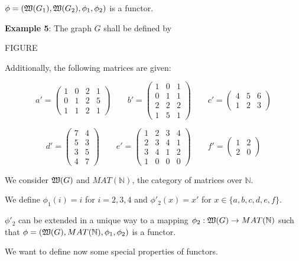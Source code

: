 $\phi = (\mbox{$\mathfrak{W}(G_1)$}, \mbox{$\mathfrak{W}(G_2)$}, \phi_1, \phi_2)$ is a functor.

\bigskip
{\bf Example 5}: The graph $G$ shall be defined by

FIGURE

Additionally, the following matrices are given:

\[
a' = \left( \begin{array}{cccc}
1 & 0 & 2 & 1 \\ 0 & 1 & 2 & 5 \\ 1 & 1 & 2 & 1
\end{array} \right)
\qquad 
b' = \left( \begin{array}{ccc}
1 & 0 & 1 \\ 0 & 1 & 1 \\ 2 & 2 & 2 \\ 1 & 5 & 1
\end{array} \right)
\qquad 
c' = \left( \begin{array}{ccc}
4 & 5 & 6 \\ 1 & 2 & 3
\end{array} \right)
\]

\[
d' = \left( \begin{array}{cc}
7 & 4 \\ 5 & 3 \\ 3 & 5 \\ 4 & 7
\end{array} \right)
\qquad
e' = \left( \begin{array}{cccc}
1&2&3&4 \\ 2&3&4&1 \\ 3&4&1&2 \\ 1&0&0&0
\end{array} \right)
\qquad
f' = \left( \begin{array}{cc}
1&2 \\ 2&0
\end{array} \right)
\]

We consider $\mbox{$\mathfrak{W}(G)$}$ and $MAT(\mathbb{N})$, the category of matrices
over $\mathbb{N}$.

We define $\phi_1(i) = i$ for $i = 2,3,4$ and $\phi'_2(x) = x'$ for $x \in \{
a, b, c, d, e, f \}$.

$\phi'_2$ can be extended in a unique way to a mapping $\phi_2 :
\mbox{$\mathfrak{W}(G)$} \to MAT(\mathbb{N})$ such that $\phi = (\mbox{$\mathfrak{W}(G)$},
MAT(\mathbb{N}), \phi_1, \phi_2)$ is a functor.

\bigskip
We want to define now some special properties of functors.

